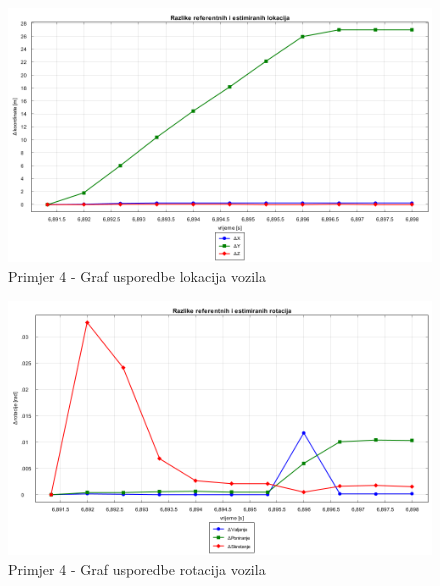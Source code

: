\begin{figure}[H]
  \includegraphics[scale=0.4]{images/imgsvox/4_zavoj_lokacije.png}
  \caption{Primjer 4 - Graf usporedbe lokacija vozila}
  \label{eval:primjer_4_rotacija_vox}
\end{figure}
\begin{figure}[H]
  \includegraphics[scale=0.4]{images/imgsvox/4_zavoj_rotacije.png}
  \caption{Primjer 4 - Graf usporedbe rotacija vozila}
  \label{eval:primjer_4_rotacija_vox}
\end{figure}